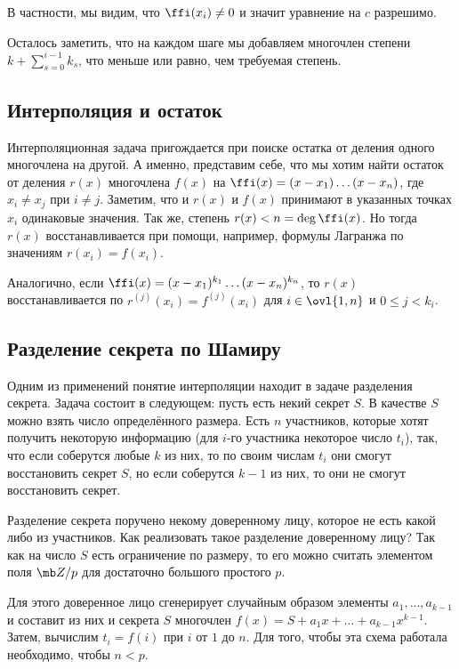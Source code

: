 В частности, мы видим, что $\ffi(x_i)\neq 0$ и значит уравнение на $c$ разрешимо.

Осталось заметить, что на каждом шаге мы добавляем многочлен степени $k+\sum_{s=0}^{i-1} k_s$, что меньше или равно, чем требуемая степень.





\subsection{Интерполяция и остаток}

Интерполяционная задача пригождается при поиске остатка от деления одного многочлена на другой. А именно, представим себе, что мы хотим найти остаток от деления $r(x)$ многочлена $f(x)$ на $\ffi(x)=(x-x_1)\dots (x-x_n)$, где $x_i\neq x_j$ при $i\neq j$. 
Заметим, что и $r(x)$ и $f(x)$ принимают в указанных точках $x_i$ одинаковые значения. Так же, степень $r(x)< n=\deg \ffi(x)$. Но тогда $r(x)$ восстанавливается при помощи, например, формулы Лагранжа по значениям $r(x_i)=f(x_i)$.

Аналогично, если $\ffi(x)=(x-x_1)^{k_1}\dots (x-x_n)^{k_n}$, то $r(x)$ восстанавливается по $r^{(j)}(x_i)=f^{(j)}(x_i)$ для $i\in \ovl{1,n}$ и $0\leq j < k_i$.

\subsection{Разделение секрета по Шамиру}
Одним из применений понятие интерполяции находит в задаче разделения секрета. Задача состоит в следующем: пусть есть некий секрет $S$. В качестве $S$ можно взять число определённого размера. Есть $n$ участников, которые хотят получить некоторую информацию (для $i$-го участника некоторое число  $t_i$), так, что если соберутся любые $k$ из них, то по своим числам $t_i$ они смогут восстановить секрет $S$, но если соберутся $k-1$ из них, то они не смогут восстановить секрет.

Разделение секрета поручено некому доверенному лицу, которое не есть какой либо из участников. Как реализовать такое разделение доверенному лицу? Так как на число $S$ есть ограничение по размеру, то его можно считать элементом поля $\mb Z/p$ для достаточно большого простого $p$.

Для этого доверенное лицо сгенерирует случайным образом элементы $a_1,\dots,a_{k-1}$ и составит из них и секрета $S$ многочлен $f(x)=S+a_1x+
\dots+a_{k-1}x^{k-1}$. Затем, вычислим $t_i=f(i)$ при $i$ от $1$ до $n$. Для того, чтобы эта схема работала необходимо, чтобы $n<p$.

